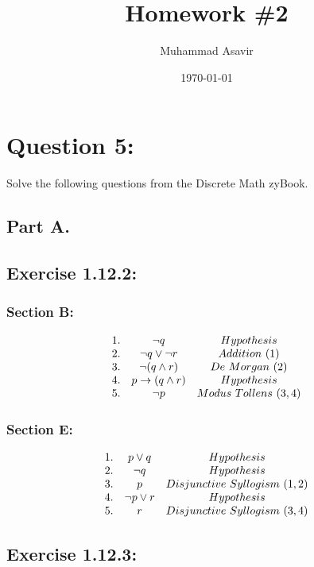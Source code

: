 \documentclass[titlepage]{article}\pagestyle{empty}
\author{Muhammad Asavir}
\title{Homework \#2}
\date{\today}
\begin{document}
\maketitle

\pagebreak
\section*{Question 5:}
Solve the following questions from the Discrete Math zyBook.
\subsection*{Part A.}
\subsection*{Exercise 1.12.2:}
\subsubsection*{Section B:}
\begin{displaymath}
\begin{array}{c c c}
1. & \neg q & Hypothesis\\
2. & \neg q \lor \neg r & Addition\ (1)\\
3. & \neg (q \land r) & De\ Morgan\ (2)\\
4. & p \to (q \land r) & Hypothesis\\
5. & \neg p & Modus\ Tollens\ (3, 4)
\end{array}
\end{displaymath}
\subsubsection*{Section E:}
\begin{displaymath}
\begin{array}{c c c}
1. & p \lor q & Hypothesis\\
2. & \neg q & Hypothesis\\
3. & p & Disjunctive\ Syllogism\ (1, 2)\\
4. & \neg p \lor r & Hypothesis\\
5. & r & Disjunctive\ Syllogism\ (3, 4)
\end{array}
\end{displaymath}
\subsection*{Exercise 1.12.3:}
\end{document}
